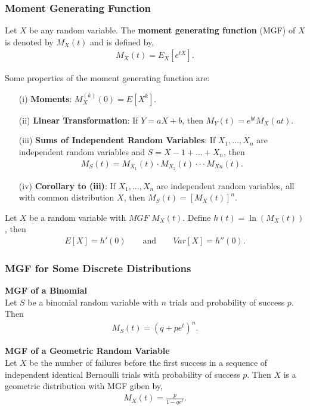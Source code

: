 \documentclass{article}
\numberwithin{theorem}{subsection}
\numberwithin{theorem}{subsubsection}
\numberwithin{lemma}{subsection}
\numberwithin{lemma}{subsubsection}
\theoremstyle{definition}
\numberwithin{definition}{subsection}
\numberwithin{definition}{subsubsection}
\begin{document}
\subsubsection{Moment Generating Function}
Let $X$ be any random variable. The \textbf{moment generating function} (MGF) of $X$ is denoted by $M_{X}(t)$ and is defined by,
\begin{gather}
    M_{X}(t) = E_{X}[e^{tX}].
\end{gather}

Some properties of the moment generating function are:
\begin{itemize}
    \item[(i)] \textbf{Moments}: $M_{X}^{(k)}(0) = E[X^k]$.
    \item[(ii)] \textbf{Linear Transformation}: If $Y = aX + b$, then $M_{Y}(t) = e^{bt}M_{X}(at)$.
    \item[(iii)] \textbf{Sums of Independent Random Variables}: If $X_{1},...,X_{n}$ are independent random variables and $S = X-{1} + ...+ X_{n}$, then
        \begin{gather}
            M_{S}(t) = M_{X_{1}}(t) \cdot M_{X_{2}}(t)\cdot\cdot\cdot M_{X{n}}(t).
        \end{gather}
    \item[(iv)] \textbf{Corollary to (iii)}: If $X_{1},...,X_{n}$ are independent random variables, all with common distribution $X$, then $M_{S}(t) = [M_{X}(t)]^n$.
\end{itemize}

Let $X$ be a random variable with $MGF$ $M_{X}(t)$. Define $h(t) = \ln(M_{X}(t))$, then
\begin{gather}
    E[X] = h'(0) \quad \quad \text{and} \quad \quad Var[X] = h''(0).
\end{gather}

\subsubsection{MGF for Some Discrete Distributions}
\noindent \textbf{MGF of a Binomial}\\
Let $S$ be a binomial random variable with $n$ trials and probability of success $p$. Then
\begin{gather}
    M_{S}(t) = (q + pe^t)^n.
\end{gather}

\noindent \textbf{MGF of a Geometric Random Variable}\\
Let $X$ be the number of failures before the first success in a sequence of independent identical Bernoulli trials with probability of success $p$. Then $X$ is a geometric distribution with MGF giben by,
\begin{gather}
    M_{X}(t) = \frac{p}{1 - qe^t}.
\end{gather}
\end{document}
